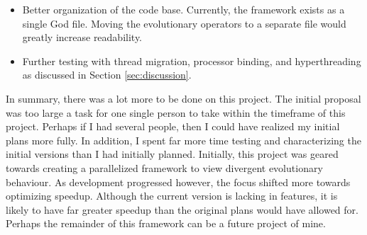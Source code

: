 \documentclass[10pt,letterpaper]{article}
\begin{document}
\begin{itemize}
\item Better organization of the code base. Currently, the framework exists as a single God file. Moving the evolutionary operators to a separate file would greatly increase readability.
\item Further testing with thread migration, processor binding, and hyperthreading as discussed in Section \ref{sec:discussion}.
\end{itemize}

In summary, there was a lot more to be done on this project. The initial proposal was too large a task for one single person to take within the timeframe of this project. Perhaps if I had several people, then I could have realized my initial plans more fully. In addition, I spent far more time testing and characterizing the initial versions than I had initially planned. Initially, this project was geared towards creating a parallelized framework to view divergent evolutionary behaviour. As development progressed however, the focus shifted more towards optimizing speedup. Although the current version is lacking in features, it is likely to have far greater speedup than the original plans would have allowed for. Perhaps the remainder of this framework can be a future project of mine.
\end{document}
